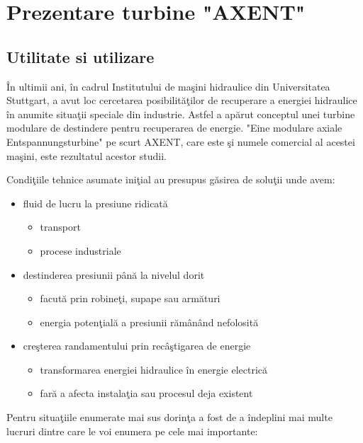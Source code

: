 \chapter{Prezentare turbine "AXENT"}\label{chapter:prezentare}


\section{Utilitate si utilizare}

\^{I}n ultimii ani, \^{i}n cadrul Institutului de ma\c{s}ini hidraulice din Universitatea Stuttgart, a avut loc cercetarea posibilit\u{a}\c{t}ilor de recuperare a energiei hidraulice \^{i}n anumite situa\c{t}ii speciale din industrie. Astfel a ap\u{a}rut conceptul unei turbine modulare de destindere pentru recuperarea de energie. "Eine modulare axiale Entspannungsturbine" pe scurt AXENT, care este \c{s}i numele comercial al acestei ma\c{s}ini, este rezultatul acestor studii.

Condi\c{t}iile tehnice asumate ini\c{t}ial au presupus g\u{a}sirea de solu\c{t}ii unde avem:

\begin{itemize}
	\item fluid de lucru la presiune ridicat\u{a}
		\begin{itemize}
			\item transport
			\item procese industriale
		\end{itemize}
	\item destinderea presiunii p\^{a}n\u{a} la nivelul dorit
		\begin{itemize}
			\item facut\u{a} prin robine\c{t}i, supape sau arm\u{a}turi
			\item energia poten\c{t}ial\u{a} a presiunii r\u{a}m\^{a}n\^{a}nd nefolosit\u{a}
		\end{itemize}
	\item cre\c{s}terea randamentului prin rec\^{a}\c{s}tigarea de energie
		\begin{itemize}
			\item transformarea energiei hidraulice \^{i}n energie electric\u{a}
			\item far\u{a} a afecta instala\c{t}ia sau procesul deja existent
		\end{itemize}	
\end{itemize}

Pentru situa\c{t}iile enumerate mai sus dorin\c{t}a a fost de a \^{i}ndeplini mai multe lucruri dintre care le voi enumera pe cele mai importante:

